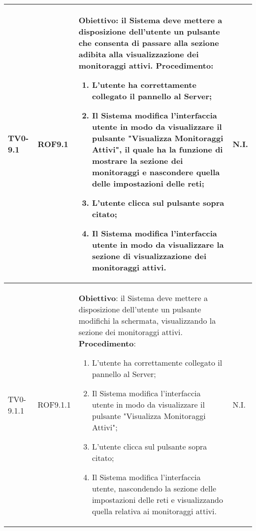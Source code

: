 \begin{longtable}{|C{.15\textwidth}|C{.13\textwidth}|m{.52\textwidth}|C{.08\textwidth}|}
TV0-9.1 & ROF9.1 &
	\textbf{Obiettivo}: il Sistema deve mettere a disposizione dell'utente un pulsante che consenta di passare alla sezione adibita alla visualizzazione dei monitoraggi attivi. \newline
	\textbf{Procedimento}:
	\begin{enumerate}
		\item L'utente ha correttamente collegato il pannello al Server;
		\item Il Sistema modifica l'interfaccia utente in modo da visualizzare il pulsante "Visualizza Monitoraggi Attivi", il quale ha la funzione di mostrare la sezione dei monitoraggi e nascondere quella delle impostazioni delle reti;
		\item L'utente clicca sul pulsante sopra citato;
		\item Il Sistema modifica l'interfaccia utente in modo da visualizzare la sezione di visualizzazione dei monitoraggi attivi.
	\end{enumerate}
	& N.I. \\
\hline	

TV0-9.1.1 & ROF9.1.1 &
	\textbf{Obiettivo}: il Sistema deve mettere a disposizione dell'utente un pulsante modifichi la schermata, visualizzando la sezione dei monitoraggi attivi. \newline
	\textbf{Procedimento}:
	\begin{enumerate}
		\item L'utente ha correttamente collegato il pannello al Server;
		\item Il Sistema modifica l'interfaccia utente in modo da visualizzare il pulsante "Visualizza Monitoraggi Attivi";
		\item L'utente clicca sul pulsante sopra citato;
		\item Il Sistema modifica l'interfaccia utente, nascondendo la sezione delle impostazioni delle reti e visualizzando quella relativa ai monitoraggi attivi.
	\end{enumerate}
	& N.I. \\
\hline	


\end{longtable}
